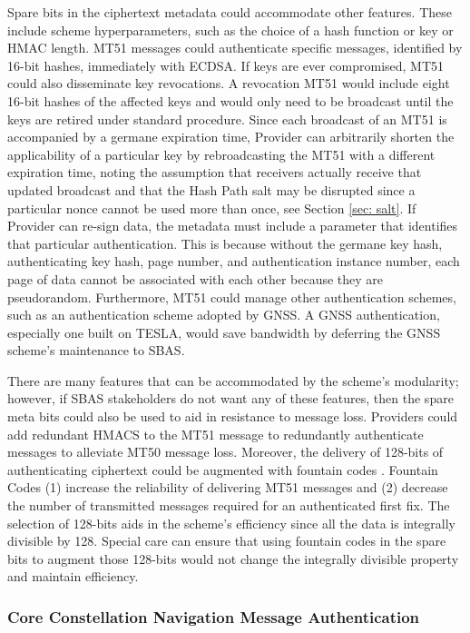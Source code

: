 \documentclass[letterpaper,times]{IONconf/IONconf}
\begin{document}
Spare bits in the ciphertext metadata could accommodate other features.
These include scheme hyperparameters, such as the choice of a hash function or key or HMAC length.
MT51 messages could authenticate specific messages, identified by 16-bit hashes, immediately with ECDSA.
If keys are ever compromised, MT51 could also disseminate key revocations.
A revocation MT51 would include eight 16-bit hashes of the affected keys and would only need to be broadcast until the keys are retired under standard procedure.
Since each broadcast of an MT51 is accompanied by a germane expiration time, Provider can arbitrarily shorten the applicability of a particular key by rebroadcasting the MT51 with a different expiration time, noting the assumption that receivers actually receive that updated broadcast and that the Hash Path salt may be disrupted since a particular nonce cannot be used more than once, see Section \ref{sec: salt}. 
If Provider can re-sign data, the metadata must include a parameter that identifies that particular authentication.
This is because without the germane key hash, authenticating key hash, page number, and authentication instance number, each page of data cannot be associated with each other because they are pseudorandom.
Furthermore, MT51 could manage other authentication schemes, such as an authentication scheme adopted by GNSS.
A GNSS authentication, especially one built on TESLA, would save bandwidth by deferring the GNSS scheme's maintenance to SBAS.

There are many features that can be accommodated by the scheme's modularity; however, if SBAS stakeholders do not want any of these features, then the spare meta bits could also be used to aid in resistance to message loss.
Providers could add redundant HMACS to the MT51 message to redundantly authenticate messages to alleviate MT50 message loss.
Moreover, the delivery of 128-bits of authenticating ciphertext could be augmented with fountain codes \cite{gnss_fountain_codes}.
Fountain Codes (1) increase the reliability of delivering MT51 messages and (2) decrease the number of transmitted messages required for an authenticated first fix.
The selection of 128-bits aids in the scheme's efficiency since all the data is integrally divisible by 128.
Special care can ensure that using fountain codes in the spare bits to augment those 128-bits would not change the integrally divisible property and maintain efficiency.

\subsubsection{Core Constellation Navigation Message Authentication}
\end{document}

